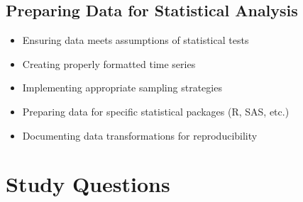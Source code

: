 \documentclass[12pt]{article}
\begin{document}
\subsection{Preparing Data for Statistical Analysis}
\begin{itemize}
    \item Ensuring data meets assumptions of statistical tests
    \item Creating properly formatted time series
    \item Implementing appropriate sampling strategies
    \item Preparing data for specific statistical packages (R, SAS, etc.)
    \item Documenting data transformations for reproducibility
\end{itemize}

\section{Study Questions}
\end{document}
